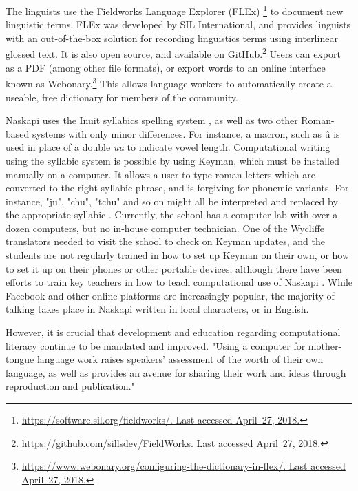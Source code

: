 The linguists use the Fieldworks Language Explorer (FLEx) \footnote{\href{https://software.sil.org/fieldworks/}{https://software.sil.org/fieldworks/. Last accessed April~27, 2018.}} to document new linguistic terms. FLEx was developed by SIL International, and provides linguists with an out-of-the-box solution for recording linguistics terms using interlinear glossed text. It is also open source, and available on GitHub.\footnote{\href{https://github.com/sillsdev/FieldWorks}{https://github.com/sillsdev/FieldWorks. Last accessed April~27, 2018.}} Users can export as a PDF (among other file formats), or export words to an online interface known as Webonary.\footnote{\href{https://www.webonary.org/configuring-the-dictionary-in-flex/}{https://www.webonary.org/configuring-the-dictionary-in-flex/. Last accessed April~27, 2018.}} This allows language workers to automatically create a useable, free dictionary for members of the community.

Naskapi uses the Inuit syllabics spelling system \cite{wals-141}, as well as two other Roman-based systems with only minor differences. For instance, a macron, such as \^u is used in place of a double \emph{uu} to indicate vowel length. Computational writing using the syllabic system is possible by using Keyman, which must be installed manually on a computer. It allows a user to type roman letters which are converted to the right syllabic phrase, and is forgiving for phonemic variants. For instance, "ju", "chu", "tchu" and so on might all be interpreted and replaced by the appropriate syllabic . %
Currently, the school has a computer lab with over a dozen computers, but no in-house computer technician. One of the Wycliffe translators needed to visit the school to check on Keyman updates, and the students are not regularly trained in how to set up Keyman on their own, or how to set it up on their phones or other portable devices, although there have been efforts to train key teachers in how to teach computational use of Naskapi \citep{jancewicz1998developing}. While Facebook and other online platforms are increasingly popular, the majority of talking takes place in Naskapi written in local characters, or in English.

However, it is crucial that development and education regarding computational literacy continue to be mandated and improved. "Using a computer for mother-tongue language work raises speakers' assessment of the worth of their own language, as well as provides an avenue for sharing their work and ideas through reproduction and publication." \citet{jancewicz2002applied}

